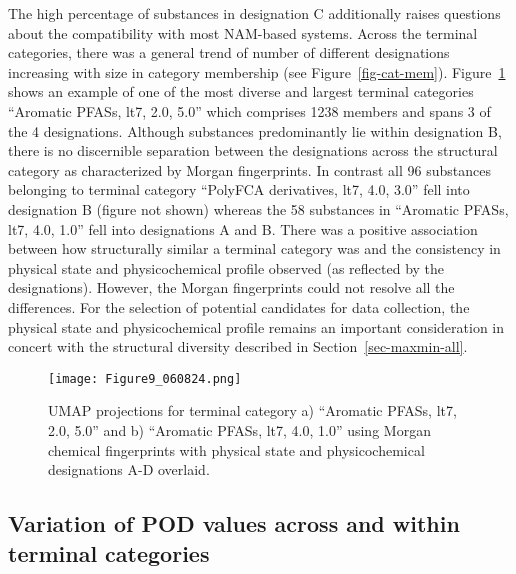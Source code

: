 \documentclass[
  super,
  preprint,
  3p]{elsarticle}
\begin{document}
The high percentage of substances in designation C additionally raises
questions about the compatibility with most NAM-based systems. Across
the terminal categories, there was a general trend of number of
different designations increasing with size in category membership (see
Figure~\ref{fig-cat-mem}). Figure~\ref{fig-tsne-physchem} shows an
example of one of the most diverse and largest terminal categories
``Aromatic PFASs, lt7, 2.0, 5.0'' which comprises 1238 members and spans
3 of the 4 designations. Although substances predominantly lie within
designation B, there is no discernible separation between the
designations across the structural category as characterized by Morgan
fingerprints. In contrast all 96 substances belonging to terminal
category ``PolyFCA derivatives, lt7, 4.0, 3.0'' fell into designation B
(figure not shown) whereas the 58 substances in ``Aromatic PFASs, lt7,
4.0, 1.0'' fell into designations A and B. There was a positive
association between how structurally similar a terminal category was and
the consistency in physical state and physicochemical profile observed
(as reflected by the designations). However, the Morgan fingerprints
could not resolve all the differences. For the selection of potential
candidates for data collection, the physical state and physicochemical
profile remains an important consideration in concert with the
structural diversity described in Section~\ref{sec-maxmin-all}.

\begin{figure}[H]

{\centering \texttt{[image: Figure9\_060824.png]}

}

\caption{\label{fig-tsne-physchem}UMAP projections for terminal category
a) ``Aromatic PFASs, lt7, 2.0, 5.0'' and b) ``Aromatic PFASs, lt7, 4.0,
1.0'' using Morgan chemical fingerprints with physical state and
physicochemical designations A-D overlaid.}

\end{figure}

\hypertarget{variation-of-pod-values-across-and-within-terminal-categories}{%
\subsection{Variation of POD values across and within terminal
categories}\label{variation-of-pod-values-across-and-within-terminal-categories}}
\end{document}
